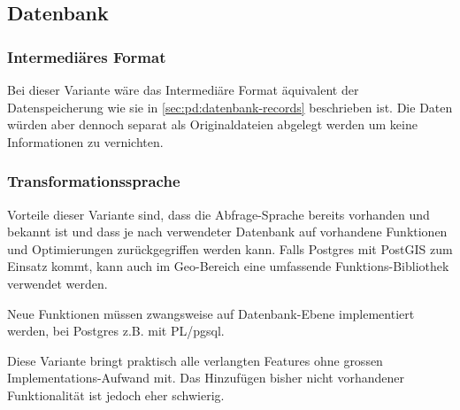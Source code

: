 
\subsection{Datenbank}
\subsubsection{Intermediäres Format}
Bei dieser Variante wäre das Intermediäre Format äquivalent der Datenspeicherung wie sie in \cref{sec:pd:datenbank-records} beschrieben ist. Die Daten würden aber dennoch separat als Originaldateien abgelegt werden um keine Informationen zu vernichten. 

\subsubsection{Transformationssprache}

Vorteile dieser Variante sind, dass die Abfrage-Sprache bereits vorhanden und bekannt ist und dass je nach verwendeter Datenbank auf vorhandene Funktionen und Optimierungen zurückgegriffen werden kann. Falls Postgres mit PostGIS zum Einsatz kommt, kann auch im Geo-Bereich eine umfassende Funktions-Bibliothek verwendet werden. 

Neue Funktionen müssen zwangsweise auf Datenbank-Ebene implementiert werden, bei Postgres z.B. mit PL/pgsql.

Diese Variante bringt praktisch alle verlangten Features ohne grossen Implementations-Aufwand mit. Das Hinzufügen bisher nicht vorhandener Funktionalität ist jedoch eher schwierig.

